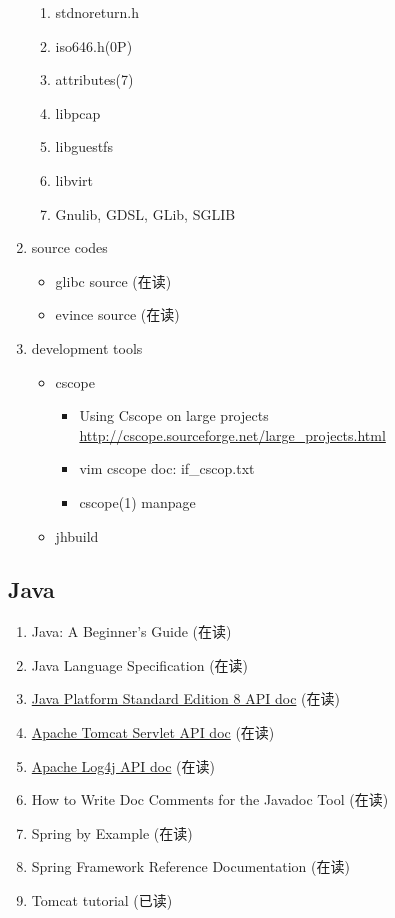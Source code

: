 \documentclass{article}
\begin{document}
\begin{enumerate}
\begin{enumerate}
            \item stdnoreturn.h
            \item iso646.h(0P)
            \item attributes(7)
            \item libpcap
            \item libguestfs
            \item libvirt
            \item Gnulib, GDSL, GLib, SGLIB
        \end{enumerate}
    \item source codes
        \begin{itemize}
            \item glibc source (在读)
            \item evince source (在读)
        \end{itemize}
    \item development tools
        \begin{itemize}
            \item cscope
                \begin{itemize}
                    \item Using Cscope on large projects \url{http://cscope.sourceforge.net/large_projects.html}
                    \item vim cscope doc: if_cscop.txt
                    \item cscope(1) manpage
                \end{itemize}
            \item jhbuild
        \end{itemize}
\end{enumerate}
\subsection{Java}
\begin{enumerate}
    \item Java: A Beginner's Guide (在读)
    \item Java Language Specification (在读)
    \item \href{http://docs.oracle.com/javase/8/docs/api/index.html?overview-summary.html}{Java Platform Standard Edition 8 API doc} (在读)
    \item \href{http://tomcat.apache.org/tomcat-8.0-doc/servletapi/}{Apache Tomcat Servlet API doc} (在读)
    \item \href{http://logging.apache.org/log4j/2.x/log4j-api/apidocs/index.html}{Apache Log4j API doc} (在读)
    \item How to Write Doc Comments for the Javadoc Tool (在读)
    \item Spring by Example (在读)
    \item Spring Framework Reference Documentation (在读)
    \item Tomcat tutorial (已读)
\end{enumerate}
\end{document}
